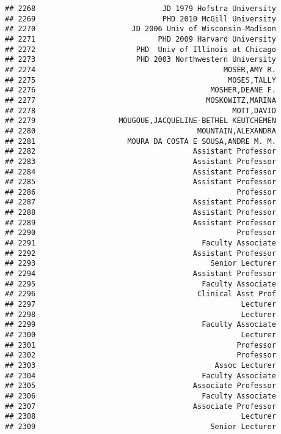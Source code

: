 \documentclass[
]{article}
\begin{document}
\begin{verbatim}
## 2268                             JD 1979 Hofstra University
## 2269                             PHD 2010 McGill University
## 2270                      JD 2006 Univ of Wisconsin-Madison
## 2271                            PHD 2009 Harvard University
## 2272                       PHD  Univ of Illinois at Chicago
## 2273                       PHD 2003 Northwestern University
## 2274                                           MOSER,AMY R.
## 2275                                            MOSES,TALLY
## 2276                                        MOSHER,DEANE F.
## 2277                                       MOSKOWITZ,MARINA
## 2278                                             MOTT,DAVID
## 2279                   MOUGOUE,JACQUELINE-BETHEL KEUTCHEMEN
## 2280                                     MOUNTAIN,ALEXANDRA
## 2281                     MOURA DA COSTA E SOUSA,ANDRE M. M.
## 2282                                    Assistant Professor
## 2283                                    Assistant Professor
## 2284                                    Assistant Professor
## 2285                                    Assistant Professor
## 2286                                              Professor
## 2287                                    Assistant Professor
## 2288                                    Assistant Professor
## 2289                                    Assistant Professor
## 2290                                              Professor
## 2291                                      Faculty Associate
## 2292                                    Assistant Professor
## 2293                                        Senior Lecturer
## 2294                                    Assistant Professor
## 2295                                      Faculty Associate
## 2296                                     Clinical Asst Prof
## 2297                                               Lecturer
## 2298                                               Lecturer
## 2299                                      Faculty Associate
## 2300                                               Lecturer
## 2301                                              Professor
## 2302                                              Professor
## 2303                                         Assoc Lecturer
## 2304                                      Faculty Associate
## 2305                                    Associate Professor
## 2306                                      Faculty Associate
## 2307                                    Associate Professor
## 2308                                               Lecturer
## 2309                                        Senior Lecturer

\end{verbatim}
\end{document}
